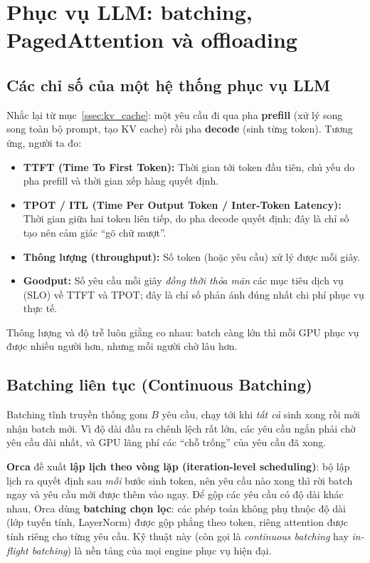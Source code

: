 
\section{Phục vụ LLM: batching, PagedAttention và offloading}
\label{sec:llm_serving}

\subsection{Các chỉ số của một hệ thống phục vụ LLM}
\label{ssec:serving_metrics}
Nhắc lại từ mục~\ref{ssec:kv_cache}: một yêu cầu đi qua pha \textbf{prefill} (xử lý song song toàn bộ prompt, tạo KV cache) rồi pha \textbf{decode} (sinh từng token). Tương ứng, người ta đo:
\begin{itemize}
	\item \textbf{TTFT (Time To First Token):} Thời gian tới token đầu tiên, chủ yếu do pha prefill và thời gian xếp hàng quyết định.
	\item \textbf{TPOT / ITL (Time Per Output Token / Inter-Token Latency):} Thời gian giữa hai token liên tiếp, do pha decode quyết định; đây là chỉ số tạo nên cảm giác “gõ chữ mượt”.
	\item \textbf{Thông lượng (throughput):} Số token (hoặc yêu cầu) xử lý được mỗi giây.
	\item \textbf{Goodput:} Số yêu cầu mỗi giây \emph{đồng thời thỏa mãn} các mục tiêu dịch vụ (SLO) về TTFT và TPOT; đây là chỉ số phản ánh đúng nhất chi phí phục vụ thực tế.
\end{itemize}
Thông lượng và độ trễ luôn giằng co nhau: batch càng lớn thì mỗi GPU phục vụ được nhiều người hơn, nhưng mỗi người chờ lâu hơn.

\subsection{Batching liên tục (Continuous Batching)}
\label{ssec:continuous_batching}
Batching tĩnh truyền thống gom $B$ yêu cầu, chạy tới khi \emph{tất cả} sinh xong rồi mới nhận batch mới. Vì độ dài đầu ra chênh lệch rất lớn, các yêu cầu ngắn phải chờ yêu cầu dài nhất, và GPU lãng phí các “chỗ trống” của yêu cầu đã xong.

\textbf{Orca} \cite{yu2022orca} đề xuất \textbf{lập lịch theo vòng lặp (iteration-level scheduling)}: bộ lập lịch ra quyết định sau \emph{mỗi} bước sinh token, nên yêu cầu nào xong thì rời batch ngay và yêu cầu mới được thêm vào ngay. Để gộp các yêu cầu có độ dài khác nhau, Orca dùng \textbf{batching chọn lọc}: các phép toán không phụ thuộc độ dài (lớp tuyến tính, LayerNorm) được gộp phẳng theo token, riêng attention được tính riêng cho từng yêu cầu. Kỹ thuật này (còn gọi là \emph{continuous batching} hay \emph{in-flight batching}) là nền tảng của mọi engine phục vụ hiện đại.

